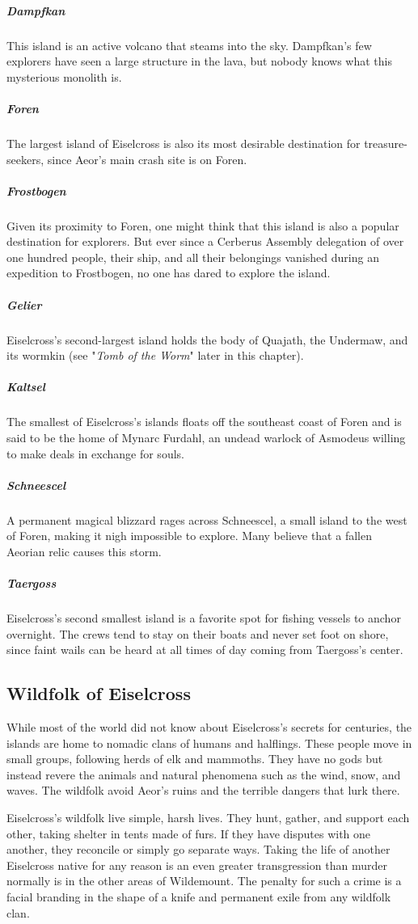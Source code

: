 \documentclass[10pt,a4paper,twoside,bg=print,twocolumn,openany,nodeprecatedcode]{dndbook}
\begin{document}
\subparagraph{Dampfkan}
This island is an active volcano that steams into the sky. Dampfkan's few explorers have seen a large structure in the lava, but nobody knows what this mysterious monolith is.

\subparagraph{Foren}
The largest island of Eiselcross is also its most desirable destination for treasure-seekers, since Aeor's main crash site is on Foren.

\subparagraph{Frostbogen}
Given its proximity to Foren, one might think that this island is also a popular destination for explorers. But ever since a Cerberus Assembly delegation of over one hundred people, their ship, and all their belongings vanished during an expedition to Frostbogen, no one has dared to explore the island.

\subparagraph{Gelier}
Eiselcross's second-largest island holds the body of Quajath, the Undermaw, and its wormkin (see "\textit{Tomb of the Worm}" later in this chapter).

\subparagraph{Kaltsel}
The smallest of Eiselcross's islands floats off the southeast coast of Foren and is said to be the home of Mynarc Furdahl, an undead warlock of Asmodeus willing to make deals in exchange for souls.

\subparagraph{Schneescel}
A permanent magical blizzard rages across Schneescel, a small island to the west of Foren, making it nigh impossible to explore. Many believe that a fallen Aeorian relic causes this storm.

\subparagraph{Taergoss}
Eiselcross's second smallest island is a favorite spot for fishing vessels to anchor overnight. The crews tend to stay on their boats and never set foot on shore, since faint wails can be heard at all times of day coming from Taergoss's center.

\subsection{Wildfolk of Eiselcross}
While most of the world did not know about Eiselcross's secrets for centuries, the islands are home to nomadic clans of humans and halflings. These people move in small groups, following herds of elk and mammoths. They have no gods but instead revere the animals and natural phenomena such as the wind, snow, and waves. The wildfolk avoid Aeor's ruins and the terrible dangers that lurk there.

Eiselcross's wildfolk live simple, harsh lives. They hunt, gather, and support each other, taking shelter in tents made of furs. If they have disputes with one another, they reconcile or simply go separate ways. Taking the life of another Eiselcross native for any reason is an even greater transgression than murder normally is in the other areas of Wildemount. The penalty for such a crime is a facial branding in the shape of a knife and permanent exile from any wildfolk clan.
\end{document}
